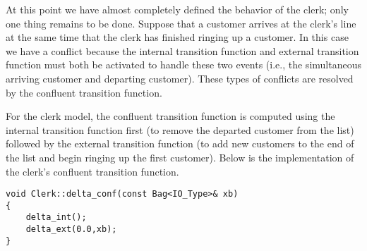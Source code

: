 At this point we have almost completely defined the behavior of the clerk; only one thing remains to be done. Suppose that a customer arrives at the clerk's line at the same time that the clerk has finished ringing up a customer. In this case we have a conflict because the internal transition function and external transition function must both be activated to handle these two events (i.e., the simultaneous arriving customer and departing customer). These types of conflicts are resolved by the confluent transition function.

For the clerk model, the confluent transition function is computed using the internal transition function first (to remove the departed customer from the list) followed by the external transition function (to add new customers to the end of the list and begin ringing up the first customer). Below is the implementation of the clerk's confluent transition function.
\begin{verbatim}
void Clerk::delta_conf(const Bag<IO_Type>& xb)
{
    delta_int();
    delta_ext(0.0,xb);
}
\end{verbatim}

